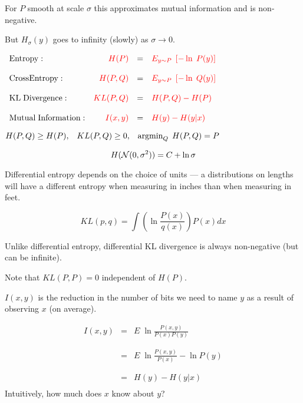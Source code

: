 {\vfill
For $P$ smooth at scale $\sigma$ this approximates mutual information and is non-negative.

\vfill
But $H_\sigma(y)$ goes to infinity (slowly) as $\sigma \rightarrow 0$.

\vfill


      
\centerline{
  $\begin{array}{lrcl}
\mathrm{Entropy}: & {\color{red} H(P)} & = & {\color{red} E_{y \sim P}\;\left[-\ln\;P(y)\right]} \\
\\
\mathrm{Cross Entropy:} & {\color{red} H(P,Q)} & = & {\color{red} E_{y \sim P}\;\left[-\ln\;Q(y)\right]} \\
\\
\mathrm{KL\; Divergence:} & {\color{red} KL(P,Q)} & = & {\color{red} H(P,Q) - H(P)} \\
\\
\mathrm{Mutual\; Information:} & {\color{red} I(x,y)} & = & {\color{red} H(y) - H(y|x)}
\end{array}$}

\vfill
\centerline{{\color{red} $H(P,Q) \geq H(P),\;\;\;KL(P,Q) \geq 0,\;\;\;\operatorname*{argmin}_Q\;H(P,Q) = P$}}


}



$$H({\cal N}(0,\sigma^2)) = C + \ln \sigma$$

\vfill
Differential entropy depends on the choice of units --- a distributions on lengths will have a different entropy
when measuring in inches than when measuring in feet.


$$KL(p,q) = \int \left( \ln \frac{P(x)}{q(x)}\right) P(x) dx$$

\vfill
Unlike differential entropy, differential KL divergence is always non-negative (but can be infinite).

\vfill
Note that $KL(P,P) = 0$ independent of $H(P)$.


$I(x,y)$ is the reduction in the number of bits we need to name $y$ as a result of observing $x$ (on average).

{\huge
\begin{eqnarray*}
I(x,y) & = & E \;\ln \frac{P(x,y)}{P(x)P(y)} \\
\\
\\
& = & E \;\ln \frac{P(x,y)}{P(x)} - \ln P(y) \\
\\
\\
& = & H(y) - H(y|x) \\
\end{eqnarray*}
}
Intuitively, how much does $x$ know about $y$?

